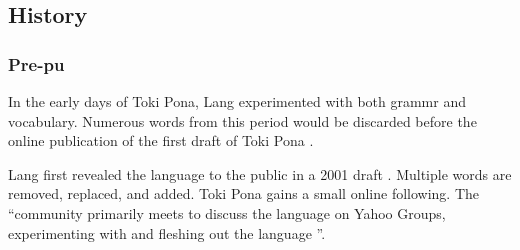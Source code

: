 \documentclass[14pt, a4paper]{extreport}
\begin{document}
    \subsection{History}
      \subsubsection{Pre-pu}
In the early days of Toki Pona, Lang experimented with both grammr and vocabulary. Numerous words from this period would be discarded before the online publication of the first draft of Toki Pona \parencite{evo}.

Lang first revealed the language to the public in a 2001 draft \parencite{firstdraft}. Multiple words are removed, replaced, and added. Toki Pona gains a small online following. The ``community primarily meets to discuss the language on Yahoo Groups, experimenting with and fleshing out the language \parencite{evo}''.

%
\end{document}
